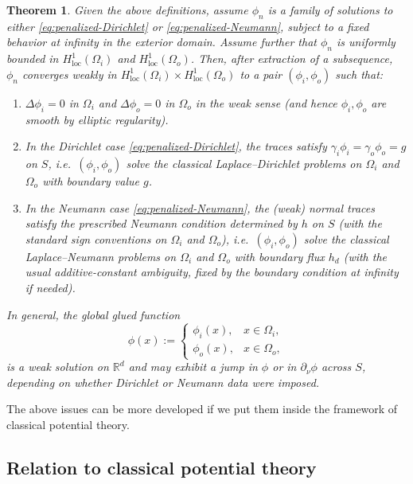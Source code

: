 \documentclass[preprint,12pt]{elsarticle}
\theoremstyle{plain}
\newtheorem{theorem}{Theorem}[section]
\theoremstyle{definition}
\theoremstyle{note}
\newcommand{\R}{\mathbb{R}}
\begin{document}
\begin{theorem}\label{thm:penalization-limit}
Given the above definitions, assume $\phi_n$ is a family of solutions to either \eqref{eq:penalized-Dirichlet} or \eqref{eq:penalized-Neumann}, subject to a fixed behavior at infinity in the exterior domain. Assume further that $\phi_n$ is
uniformly bounded in $H^1_{\mathrm{loc}}(\Omega_i)$ and $H^1_{\mathrm{loc}}(\Omega_o)$. Then, after extraction of a subsequence, $\phi_n$ converges weakly in $H^1_{\mathrm{loc}}(\Omega_i)\times H^1_{\mathrm{loc}}(\Omega_o)$ to a pair $(\phi_i,\phi_o)$ such that:
\begin{enumerate}
\item $\Delta \phi_i = 0$ in $\Omega_i$ and $\Delta\phi_o=0$ in $\Omega_o$ in the weak sense (and hence $\phi_i,\phi_o$ are smooth by elliptic regularity).
\item In the Dirichlet case \eqref{eq:penalized-Dirichlet}, the traces satisfy $\gamma_i\phi_i=\gamma_o\phi_o=g$ on $S$, i.e.\ $(\phi_i,\phi_o)$ solve the classical Laplace--Dirichlet problems on $\Omega_i$ and $\Omega_o$ with boundary value $g$.
\item In the Neumann case \eqref{eq:penalized-Neumann}, the (weak) normal traces satisfy the prescribed Neumann condition determined by $h$ on $S$ (with the standard sign conventions on $\Omega_i$ and $\Omega_o$), i.e.\ $(\phi_i,\phi_o)$ solve the classical Laplace--Neumann problems on $\Omega_i$ and $\Omega_o$ with boundary flux $h_d$ (with the usual additive-constant ambiguity, fixed by the boundary condition at infinity if needed).
\end{enumerate}
In general, the global glued function
\[
\phi(x):=\begin{cases}
\phi_i(x), & x\in \Omega_i,\\
\phi_o(x), & x\in \Omega_o,
\end{cases}
\]
is a weak solution on $\R^d$ and may exhibit a jump in $\phi$ or in $\partial_\nu\phi$
across $S$, depending on whether Dirichlet or Neumann data were imposed.
\end{theorem}
The above issues can be more developed if we put them inside the framework of classical potential theory.

\subsection{Relation to classical potential theory} 
\end{document}
